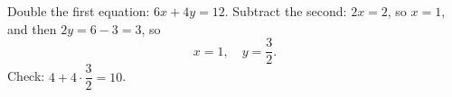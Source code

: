 Double the first equation: $6x+4y=12$. Subtract the second: $2x=2$, so $x=1$, and then $2y=6-3=3$, so
\[
\boxed{x=1,\quad y=\dfrac{3}{2}}.
\]
Check: $4+4\cdot\dfrac{3}{2}=10$.
